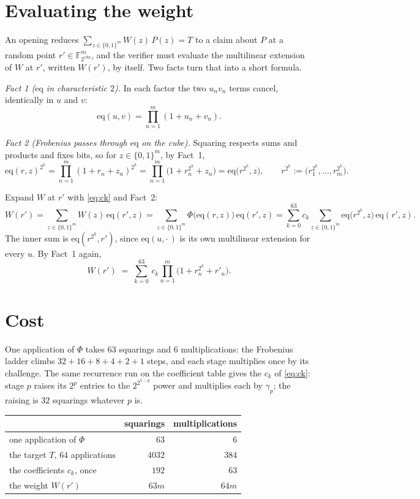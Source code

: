 \documentclass[11pt]{article}
\newcommand{\F}{\mathbb{F}}
\newcommand{\eq}{\mathrm{eq}}
\begin{document}
\section*{Evaluating the weight}

An opening reduces $\sum_{z\in\{0,1\}^m}W(z)\,P(z)=T$ to a claim about $P$ at a random point $r'\in\F_{2^{192}}^m$, and the verifier must evaluate the multilinear extension of $W$ at $r'$, written $W(r')$, by itself. Two facts turn that into a short formula.

\emph{Fact 1 ($\eq$ in characteristic $2$).} In each factor the two $u_nv_n$ terms cancel, identically in $u$ and $v$:
\[
\eq(u,v)=\prod_{n=1}^m(1+u_n+v_n).
\]

\emph{Fact 2 (Frobenius passes through $\eq$ on the cube).} Squaring respects sums and products and fixes bits, so for $z\in\{0,1\}^m$, by Fact~1,
\[
\eq(r,z)^{2^k}=\prod_{n=1}^m(1+r_n+z_n)^{2^k}=\prod_{n=1}^m\bigl(1+r_n^{2^k}+z_n\bigr)=\eq\bigl(r^{2^k},z\bigr),
\qquad r^{2^k}:=\bigl(r_1^{2^k},\dots,r_m^{2^k}\bigr).
\]

Expand $W$ at $r'$ with \eqref{eq:ck} and Fact~2:
\[
W(r')=\sum_{z\in\{0,1\}^m}W(z)\,\eq(r',z)
=\sum_{z\in\{0,1\}^m}\Phi\bigl(\eq(r,z)\bigr)\,\eq(r',z)
=\sum_{k=0}^{63}c_k\sum_{z\in\{0,1\}^m}\eq\bigl(r^{2^k},z\bigr)\,\eq(r',z).
\]
The inner sum is $\eq(r^{2^k},r')$, since $\eq(u,\cdot\,)$ is its own multilinear extension for every $u$. By Fact~1 again,
\[
\boxed{\ \
W(r') \;=\; \sum_{k=0}^{63}\, c_k \prod_{n=1}^m
\bigl( 1 + r_n^{2^k} + r'_n \bigr).
\ \ }
\]

\section*{Cost}

One application of $\Phi$ takes $63$ squarings and $6$ multiplications: the Frobenius ladder climbs $32+16+8+4+2+1$ steps, and each stage multiplies once by its challenge. The same recurrence run on the coefficient table gives the $c_k$ of \eqref{eq:ck}: stage $p$ raises its $2^p$ entries to the $2^{2^{5-p}}$ power and multiplies each by $\gamma_p$; the raising is $32$ squarings whatever $p$ is.

\begin{center}
\begin{tabular}{lrr}
& squarings & multiplications\\[2pt]
\hline
one application of $\Phi$ & $63$ & $6$\\
the target $T$, $64$ applications & $4032$ & $384$\\
the coefficients $c_k$, once & $192$ & $63$\\
the weight $W(r')$ & $63m$ & $64m$\\
\end{tabular}
\end{center}
\end{document}
